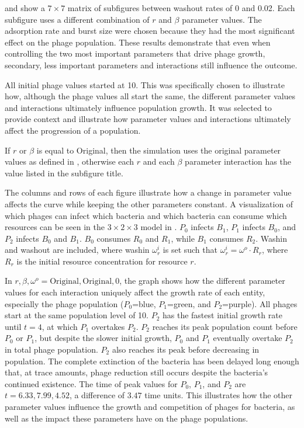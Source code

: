  and  show a $7\times7$ matrix of subfigures between washout rates of 0 and 0.02. 
Each subfigure uses a different combination of $r$ and $\beta$ parameter values. 
The adsorption rate and burst size were chosen because they had the most significant effect on the phage population. 
These results demonstrate that even when controlling the two most important parameters that drive phage growth, secondary, less important parameters and interactions still influence the outcome. 

All initial phage values started at 10. 
This was specifically chosen to illustrate how, although the phage values all start the same, the different parameter values and interactions ultimately influence population growth. 
It was selected to provide context and illustrate how parameter values and interactions ultimately affect the progression of a population. 

If $r$ or $\beta$ is equal to Original, then the simulation uses the original parameter values as defined in , otherwise each $r$ and each $\beta$ parameter interaction has the value listed in the subfigure title. 

The columns and rows of each figure illustrate how a change in parameter value affects the curve while keeping the other parameters constant. 
A visualization of which phages can infect which bacteria and which bacteria can consume which resources can be seen in the $3 \times 2\times 3$ model in . 
$P_0$ infects $B_1$, $P_1$ infects $B_0$, and $P_2$ infects $B_0$ and $B_1$. 
$B_0$ consumes $R_0$ and $R_1$, while $B_1$ consumes $R_2$. 
Washin and washout are included, where washin $\omega^i_r$ is set such that $\omega^i_r = \omega^o \cdot R_r$, where $R_r$ is the initial resource concentration for resource $r$. 

In $r, \beta, \omega^o=\text{Original}, \text{Original}, 0$, the graph shows how the different parameter values for each interaction uniquely affect the growth rate of each entity, especially the phage population ($P_0$=blue, $P_1$=green, and $P_2$=purple). 
All phages start at the same population level of 10. 
$P_2$ has the fastest initial growth rate until $t=4$, at which $P_1$ overtakes $P_2$. 
$P_2$ reaches its peak population count before $P_0$ or $P_1$, but despite the slower initial growth, $P_0$ and $P_1$ eventually overtake $P_2$ in total phage population. 
$P_2$ also reaches its peak before decreasing in population. 
The complete extinction of the bacteria has been delayed long enough that, at trace amounts, phage reduction still occurs despite the bacteria’s continued existence. 
The time of peak values for $P_0$, $P_1$, and $P_2$ are $t=6.33, 7.99, 4.52$, a difference of $3.47$ time units. 
This illustrates how the other parameter values influence the growth and competition of phages for bacteria, as well as the impact these parameters have on the phage populations. 

